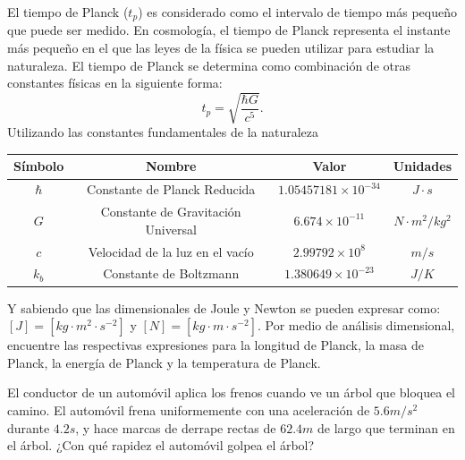 \begin{mdframed}[style=warning]
	\begin{ejercicio}
		El tiempo de Planck ($t_p$) es considerado como el intervalo de tiempo más pequeño que puede ser medido. En cosmología, el tiempo de Planck representa el instante más pequeño en el que las leyes de la física se pueden utilizar para estudiar la naturaleza. El tiempo de Planck se determina como combinación de otras constantes físicas en la siguiente forma:
			$$ t_p = \sqrt{\frac{\hbar G}{c^5}}. $$
		Utilizando las constantes fundamentales de la naturaleza
			\begin{table}[H]
				\centering
				\begin{tabular}{||c|c|c|c||}
					\hline
					\hline
						Símbolo & Nombre & Valor & Unidades \\
					\hline
					\hline
						$\hbar$ & Constante de Planck Reducida & $1.05457181\times 10^{-34}$ & $J\cdot s$ \\
						$G$ & Constante de Gravitación Universal & $6.674\times 10^{-11}$ & $N\cdot m^2 /kg^2$ \\
						$c$ & Velocidad de la luz en el vacío & $2.99792\times 10^8$ & $m/s$ \\
						$k_b$ & Constante de Boltzmann & $1.380649\times 10^{-23}$ & $J/K$ \\
					\hline
					\hline
				\end{tabular}
				\label{tabla}
			\end{table}
		Y sabiendo que las dimensionales de Joule y Newton se pueden expresar como: $[J] = [kg\cdot m^2 \cdot s^{-2}]$ y $[N] = [kg\cdot m\cdot s^{-2}]$. Por medio de análisis dimensional, encuentre las respectivas expresiones para la longitud de Planck, la masa de Planck, la energía de Planck y la temperatura de Planck.
	\end{ejercicio}
\end{mdframed}






\begin{mdframed}[style=warning]
	\begin{ejercicio}
		El conductor de un automóvil aplica los frenos cuando ve un árbol que bloquea el camino. El automóvil frena uniformemente con una aceleración de $5.6m/s^2$ durante $4.2s$, y hace marcas de derrape rectas de $62.4m$ de largo que terminan en el árbol. ¿Con qué rapidez el automóvil golpea el árbol?
	\end{ejercicio}
\end{mdframed}






